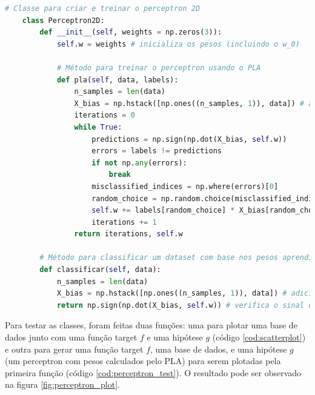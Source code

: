 \begin{lstlisting}[language=Python, caption=Perceptron, label=cod:perceptron]
    # Classe para criar e treinar o perceptron 2D
    class Perceptron2D:
        def __init__(self, weights = np.zeros(3)):
            self.w = weights # inicializa os pesos (incluindo o w_0)
        
            # Método para treinar o perceptron usando o PLA
            def pla(self, data, labels): 
                n_samples = len(data)
                X_bias = np.hstack([np.ones((n_samples, 1)), data]) # adiciona uma coluna de 1s para o X_0 (coordenada artificial)
                iterations = 0
                while True:
                    predictions = np.sign(np.dot(X_bias, self.w))
                    errors = labels != predictions
                    if not np.any(errors):
                        break
                    misclassified_indices = np.where(errors)[0]
                    random_choice = np.random.choice(misclassified_indices)
                    self.w += labels[random_choice] * X_bias[random_choice] # atualiza os pesos
                    iterations += 1
                return iterations, self.w
        
        # Método para classificar um dataset com base nos pesos aprendidos.
        def classificar(self, data):
            n_samples = len(data)
            X_bias = np.hstack([np.ones((n_samples, 1)), data]) # adiciona uma coluna de 1s para o bias X_0
            return np.sign(np.dot(X_bias, self.w)) # verifica o sinal do produto escalar entre x e w
\end{lstlisting}


Para testar as classes, foram feitas duas funções: uma para plotar uma base de dados junto com uma função target $f$ e uma hipótese $g$ (código \ref{cod:scatterplot}) e outra para gerar uma função target $f$, uma base de dados, e uma hipótese $g$ (um perceptron com pesos calculados pelo PLA) para serem plotadas pela primeira função (código \ref{cod:perceptron_test}). O resultado pode ser observado na figura \ref{fig:perceptron_plot}. 

